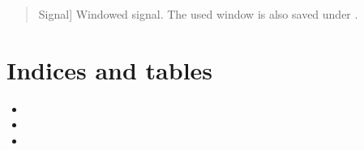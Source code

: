 \documentclass[letterpaper,10pt,english]{sphinxmanual}
\begin{document}
\begin{fulllineitems}
\begin{quote}
\begin{description}
\begin{description}
\end{description}

\begin{description}
\sphinxlineitem{\sphinxstylestrong{new\_sig}}{[}Signal{]}
\sphinxAtStartPar
Windowed signal. The used window is also saved under .

\end{description}

\end{description}\end{quote}

\end{fulllineitems}



\chapter{Indices and tables}
\label{\detokenize{index:indices-and-tables}}\begin{itemize}
\item {} 
\sphinxAtStartPar
{}

\item {} 
\sphinxAtStartPar
{}

\item {} 
\sphinxAtStartPar
{}

\end{itemize}
\end{document}

